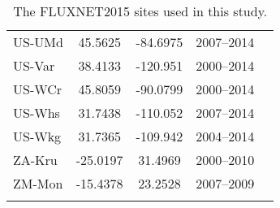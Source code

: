 \begin{longtable}{lcccc}
US-UMd &  45.5625 &  -84.6975 &  2007–2014 &  \cite{Gough2013}\\
US-Var &  38.4133 &  -120.951 &  2000–2014 & \cite{Ma2007}\\
US-WCr &  45.8059 &  -90.0799 &  2000–2014 &  \cite{Cook2004}\\
US-Whs &  31.7438 &  -110.052 &  2007–2014 &  \cite{Scott2010}\\
US-Wkg &  31.7365 &  -109.942 &  2004–2014 &  \cite{Scott2016}\\
ZA-Kru &  -25.0197 &  31.4969 &  2000–2010 &  \cite{Scholes2001}\\
ZM-Mon &  -15.4378 &  23.2528 &  2007–2009 &  \cite{Scanlon2004}\\
\bottomrule
\caption{The FLUXNET2015 sites used in this study.}
\end{longtable}